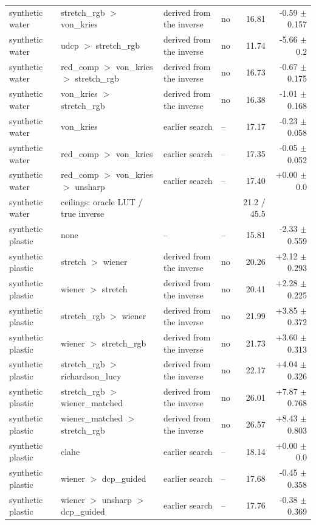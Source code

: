 \begin{longtable}{llllrr}
synthetic water & stretch\_rgb $>$ von\_kries & derived from the inverse & no & 16.81 & -0.59 $\pm$ 0.157 \\
synthetic water & udcp $>$ stretch\_rgb & derived from the inverse & no & 11.74 & -5.66 $\pm$ 0.2 \\
synthetic water & red\_comp $>$ von\_kries $>$ stretch\_rgb & derived from the inverse & no & 16.73 & -0.67 $\pm$ 0.175 \\
synthetic water & von\_kries $>$ stretch\_rgb & derived from the inverse & no & 16.38 & -1.01 $\pm$ 0.168 \\
synthetic water & von\_kries & earlier search & -- & 17.17 & -0.23 $\pm$ 0.058 \\
synthetic water & red\_comp $>$ von\_kries & earlier search & -- & 17.35 & -0.05 $\pm$ 0.052 \\
synthetic water & red\_comp $>$ von\_kries $>$ unsharp & earlier search & -- & 17.40 & +0.00 $\pm$ 0.0 \\
synthetic water & ceilings: oracle LUT / true inverse &  &  & 21.2 / 45.5 &  \\
synthetic plastic & none & -- & -- & 15.81 & -2.33 $\pm$ 0.559 \\
synthetic plastic & stretch $>$ wiener & derived from the inverse & no & 20.26 & +2.12 $\pm$ 0.293 \\
synthetic plastic & wiener $>$ stretch & derived from the inverse & no & 20.41 & +2.28 $\pm$ 0.225 \\
synthetic plastic & stretch\_rgb $>$ wiener & derived from the inverse & no & 21.99 & +3.85 $\pm$ 0.372 \\
synthetic plastic & wiener $>$ stretch\_rgb & derived from the inverse & no & 21.73 & +3.60 $\pm$ 0.313 \\
synthetic plastic & stretch\_rgb $>$ richardson\_lucy & derived from the inverse & no & 22.17 & +4.04 $\pm$ 0.326 \\
synthetic plastic & stretch\_rgb $>$ wiener\_matched & derived from the inverse & no & 26.01 & +7.87 $\pm$ 0.768 \\
synthetic plastic & wiener\_matched $>$ stretch\_rgb & derived from the inverse & no & 26.57 & +8.43 $\pm$ 0.803 \\
synthetic plastic & clahe & earlier search & -- & 18.14 & +0.00 $\pm$ 0.0 \\
synthetic plastic & wiener $>$ dcp\_guided & earlier search & -- & 17.68 & -0.45 $\pm$ 0.358 \\
synthetic plastic & wiener $>$ unsharp $>$ dcp\_guided & earlier search & -- & 17.76 & -0.38 $\pm$ 0.369 \\

\end{longtable}

